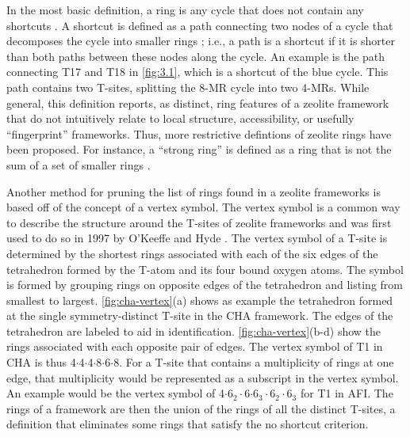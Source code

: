 \documentclass[preprint,numrefs,noinfo,sort&compress]{elsarticle}
\begin{document}

 In the most basic definition, a ring is any cycle that does not contain any shortcuts \cite{guttman-ring-1990,goetzke-properties-1991}.  A shortcut is defined as a path connecting two nodes of a cycle that decomposes the cycle into smaller rings \cite{guttman-ring-1990,goetzke-properties-1991}; i.e., a path is a shortcut if it is shorter than both paths between these nodes along the cycle. An example is the path connecting T17 and T18 in \cref{fig:3.1}, which is a shortcut of the blue cycle. This path contains two T-sites, splitting the 8-MR cycle into two 4-MRs. While general, this definition reports, as distinct, ring features of a zeolite framework that do not intuitively relate to local structure, accessibility, or usefully ``fingerprint'' frameworks. Thus, more restrictive defintions of zeolite rings have been proposed. For instance, a ``strong ring'' is defined as a ring that is not the sum of a set of smaller rings \cite{goetzke-properties-1991,blatov-three-periodic-2007}.

 Another method for pruning the list of rings found in a zeolite frameworks is based off of the concept of a vertex symbol. The vertex symbol is a common way to describe the structure around the T-sites of zeolite frameworks and was first used to do so in 1997 by O'Keeffe and Hyde \cite{okeeffe-vertex-1997}. The vertex symbol of a T-site is determined by the shortest rings associated with each of the six edges of the tetrahedron formed by the T-atom and its four bound oxygen atoms. The symbol is formed by grouping rings on opposite edges of the tetrahedron and listing from smallest to largest. \cref{fig:cha-vertex}(a) shows as example the tetrahedron formed at the single symmetry-distinct T-site in the CHA framework. The edges of the tetrahedron are labeled to aid in identification. \cref{fig:cha-vertex}(b-d) show the rings associated with each opposite pair of edges. The vertex symbol of T1 in CHA is thus 4\(\cdot\)4\(\cdot\)4\(\cdot\)8\(\cdot\)6\(\cdot\)8. For a T-site that contains a multiplicity of rings at one edge, that multiplicity would be represented as a subscript in the vertex symbol. An example would be the vertex symbol of 4\(\cdot\)6\(_{\text{2}} \cdot\)6\(\cdot\)6\(_{\text{3}} \cdot\)6\(_{\text{2}} \cdot\)6\(_{\text{3}}\) for T1 in AFI.  The rings of a framework are then the union of the rings of all the distinct T-sites, a definition that eliminates some rings that satisfy the no shortcut criterion. 
\end{document}
